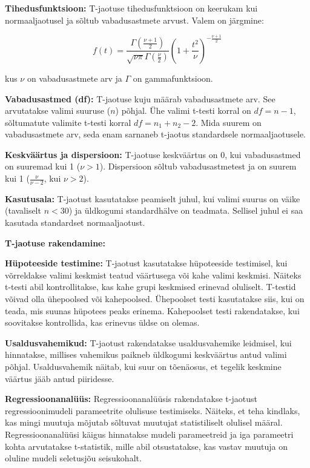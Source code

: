 \documentclass[
]{book}
\theoremstyle{definition}
\theoremstyle{definition}
\theoremstyle{definition}
\theoremstyle{definition}
\theoremstyle{remark}
\begin{document}
\textbf{Tihedusfunktsioon:} T-jaotuse tihedusfunktsioon on keerukam kui normaaljaotusel ja sõltub vabadusastmete arvust. Valem on järgmine:

\[f(t) = \frac{\Gamma\left(\frac{\nu + 1}{2}\right)}{\sqrt{\nu\pi}\Gamma\left(\frac{\nu}{2}\right)} \left(1 + \frac{t^2}{\nu}\right)^{-\frac{\nu + 1}{2}}\]

kus \(\nu\) on vabadusastmete arv ja \(\Gamma\) on gammafunktsioon.

\textbf{Vabadusastmed (df):} T-jaotuse kuju määrab vabadusastmete arv. See arvutatakse valimi suuruse (\(n\)) põhjal. Ühe valimi t-testi korral on \(df = n - 1\), sõltumatute valimite t-testi korral \(df = n_1 + n_2 - 2\). Mida suurem on vabadusastmete arv, seda enam sarnaneb t-jaotus standardsele normaaljaotusele.

\textbf{Keskväärtus ja dispersioon:} T-jaotuse keskväärtus on 0, kui vabadusastmed on suuremad kui 1 (\(\nu > 1\)). Dispersioon sõltub vabadusastmetest ja on suurem kui 1 (\(\frac{\nu}{\nu-2}\), kui \(\nu>2\)).

\textbf{Kasutusala:} T-jaotust kasutatakse peamiselt juhul, kui valimi suurus on väike (tavaliselt \(n < 30\)) ja üldkogumi standardhälve on teadmata. Sellisel juhul ei saa kasutada standardset normaaljaotust.

\textbf{T-jaotuse rakendamine:}

\textbf{Hüpoteeside testimine:} T-jaotust kasutatakse hüpoteeside testimisel, kui võrreldakse valimi keskmist teatud väärtusega või kahe valimi keskmisi. Näiteks t-testi abil kontrollitakse, kas kahe grupi keskmised erinevad oluliselt. T-testid võivad olla ühepoolsed või kahepoolsed. Ühepoolset testi kasutatakse siis, kui on teada, mis suunas hüpotees peaks erinema. Kahepoolset testi rakendatakse, kui soovitakse kontrollida, kas erinevus üldse on olemas.

\textbf{Usaldusvahemikud:} T-jaotust rakendatakse usaldusvahemike leidmisel, kui hinnatakse, millises vahemikus paikneb üldkogumi keskväärtus antud valimi põhjal. Usaldusvahemik näitab, kui suur on tõenäosus, et tegelik keskmine väärtus jääb antud piiridesse.

\textbf{Regressioonanalüüs:} Regressioonanalüüsis rakendatakse t-jaotust regressioonimudeli parameetrite olulisuse testimiseks. Näiteks, et teha kindlaks, kas mingi muutuja mõjutab sõltuvat muutujat statistiliselt olulisel määral. Regressioonanalüüsi käigus hinnatakse mudeli parameetreid ja iga parameetri kohta arvutatakse t-statistik, mille abil otsustatakse, kas vastav muutuja on oluline mudeli seletusjõu seisukohalt.
\end{document}
